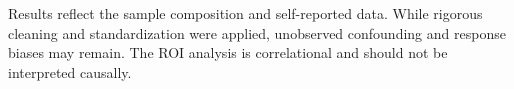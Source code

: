 Results reflect the sample composition and self-reported data. While rigorous cleaning and standardization were applied, unobserved confounding and response biases may remain. The ROI analysis is correlational and should not be interpreted causally.
